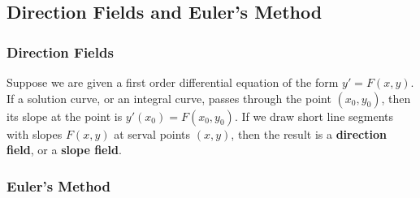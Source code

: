 \subsection{Direction Fields and Euler's Method}

\subsubsection*{Direction Fields}
Suppose we are given a first order differential equation of the form \(y'=F(x,y)\).
If a solution curve, or an integral curve, passes through the point
\((x_0,y_0)\), then its slope at the point is \(y'(x_0)=F(x_0,y_0)\).
If we draw short line segments with slopes \(F(x,y)\) at serval points
\((x,y)\), then the result is a \textbf{direction field}, or a
\textbf{slope field}.

\subsubsection*{Euler's Method}